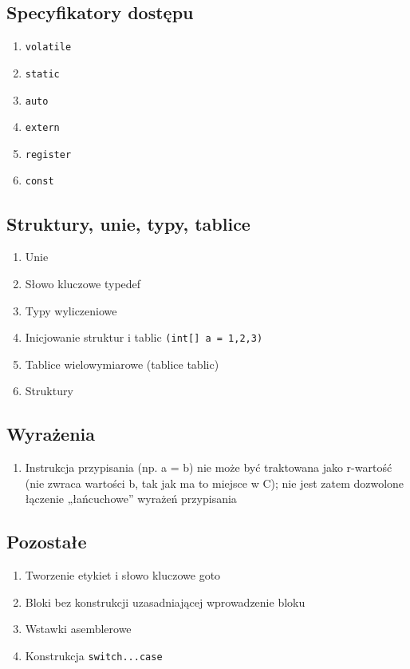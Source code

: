 \documentclass[a4paper,twoside,openright,11pt]{report}
\begin{document}
  \subsection {Specyfikatory dostępu}
    \begin{enumerate}
      \item \texttt{volatile}
      \item \texttt{static}
      \item \texttt{auto}
      \item \texttt{extern}
      \item \texttt{register}
      \item \texttt{const}
    \end{enumerate}
  \subsection {Struktury, unie, typy, tablice}
    \begin{enumerate}
      \item Unie
      \item Słowo kluczowe typedef
      \item Typy wyliczeniowe
      \item Inicjowanie struktur i tablic \texttt{(int[] a = {1,2,3})}
      \item Tablice wielowymiarowe (tablice tablic) 
      \item Struktury
    \end{enumerate}
  \subsection {Wyrażenia}
    \begin{enumerate}
      \item Instrukcja przypisania (np. a = b) nie może być traktowana jako r-wartość (nie zwraca wartości b, tak jak ma to miejsce w C); nie jest zatem dozwolone łączenie „łańcuchowe” wyrażeń przypisania
    \end{enumerate}
  \subsection {Pozostałe}
    \begin{enumerate}
      \item Tworzenie etykiet i słowo kluczowe goto
      \item Bloki bez konstrukcji uzasadniającej wprowadzenie bloku
      \item Wstawki asemblerowe
      \item Konstrukcja \texttt{switch...case}
    \end{enumerate}
\end{document}
